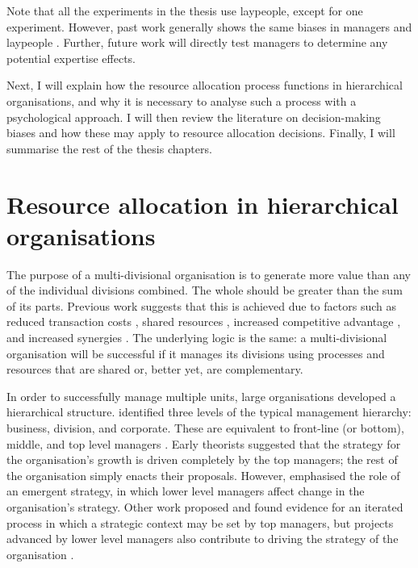 \documentclass[a4paper, nobind, dvipsnames]{templates/ociamthesis}
\theoremstyle{definition}
\theoremstyle{definition}
\theoremstyle{definition}
\theoremstyle{definition}
\theoremstyle{remark}
\begin{document}
Note that all the experiments in the thesis use laypeople, except for one
experiment. However, past work generally shows the same biases in managers and
laypeople \autocite[with some showing more bias, e.g.,][]{haigh2005}. Further, future work
will directly test managers to determine any potential expertise effects.

Next, I will explain how the resource allocation process functions in
hierarchical organisations, and why it is necessary to analyse such a process
with a psychological approach. I will then review the literature on
decision-making biases and how these may apply to resource allocation decisions.
Finally, I will summarise the rest of the thesis chapters.

\section{Resource allocation in hierarchical organisations}

The purpose of a multi-divisional organisation is to generate more value than
any of the individual divisions combined. The whole should be greater than the
sum of its parts. Previous work suggests that this is achieved due to factors
such as reduced transaction costs \autocite{williamson1981,teece1982,teece1980,coase1937}, shared resources \autocite{wernerfelt1984,barney1991}, increased
competitive advantage \autocite{porter1980,porter1985}, and increased synergies
\autocite{barney1988}. The underlying logic is the same: a multi-divisional organisation
will be successful if it manages its divisions using processes and resources
that are shared or, better yet, are complementary.

In order to successfully manage multiple units, large organisations developed a
hierarchical structure. \textcite{bower1970} identified three levels of the typical
management hierarchy: business, division, and corporate. These are equivalent to
front-line (or bottom), middle, and top level managers \autocite{noda1996}. Early
theorists suggested that the strategy for the organisation's growth is driven
completely by the top managers; the rest of the organisation simply enacts their
proposals. However, \textcite{mintzberg1985} emphasised the role of an emergent strategy,
in which lower level managers affect change in the organisation's strategy.
Other work proposed and found evidence for an iterated process in which a
strategic context may be set by top managers, but projects advanced by lower
level managers also contribute to driving the strategy of the organisation
\autocite{noda1996,burgelman1983,bower1970}.
\end{document}
